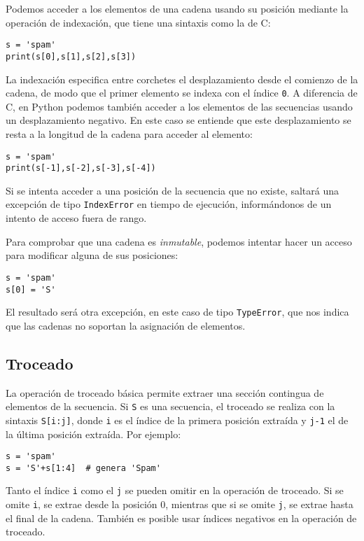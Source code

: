 Podemos acceder a los elementos de una cadena usando su posición mediante la operación de indexación, que tiene una sintaxis como la de C:

\begin{lstlisting}
s = 'spam'
print(s[0],s[1],s[2],s[3])
\end{lstlisting}

La indexación especifica entre corchetes el desplazamiento desde el comienzo de la cadena, de modo que el primer elemento se indexa con el índice \texttt{0}. A diferencia de C, en Python podemos también acceder a los elementos de las secuencias usando un desplazamiento negativo. En este caso se entiende que este desplazamiento se resta a la longitud de la cadena para acceder al elemento:

\begin{lstlisting}
s = 'spam'
print(s[-1],s[-2],s[-3],s[-4]) 
\end{lstlisting}

Si se intenta acceder a una posición de la secuencia que no existe, saltará una excepción de tipo \texttt{IndexError} en tiempo de ejecución, informándonos de un intento de acceso fuera de rango.

Para comprobar que una cadena es \emph{inmutable}, podemos intentar hacer un acceso para modificar alguna de sus posiciones:

\begin{lstlisting}
s = 'spam'
s[0] = 'S'
\end{lstlisting}

El resultado será otra excepción, en este caso de tipo \texttt{TypeError}, que nos indica que las cadenas no soportan la asignación de elementos.

\subsection{Troceado}

La operación de troceado básica permite extraer una sección contingua de elementos de la secuencia. Si \texttt{S} es una secuencia, el troceado se realiza con la sintaxis \texttt{S[i:j]}, donde \texttt{i} es el índice de la primera posición extraída y \texttt{j-1} el de la última posición extraída. Por ejemplo:

\begin{lstlisting}
s = 'spam'
s = 'S'+s[1:4]  # genera 'Spam'
\end{lstlisting}

Tanto el índice \texttt{i} como el \texttt{j} se pueden omitir en la operación de troceado. Si se omite \texttt{i}, se extrae desde la posición 0, mientras que si se omite \texttt{j}, se extrae hasta el final de la cadena. También es posible usar índices negativos en la operación de troceado.

